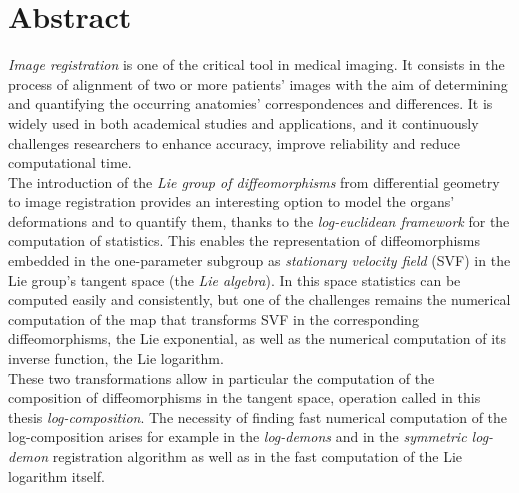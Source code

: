 
\qquad
\pagestyle{empty}
\newpage


\section*{Abstract}

\emph{Image registration} is one of the critical tool in medical imaging. It consists in the process of alignment of two or more patients' images with the aim of determining and quantifying the occurring anatomies' correspondences and differences.
It is widely used in both academical studies and applications, and it continuously challenges researchers to enhance accuracy, improve reliability and reduce computational time.\\

The introduction of the \emph{Lie group of diffeomorphisms} from differential geometry to image registration provides an interesting option to model the organs' deformations and to quantify them, thanks to the \emph{log-euclidean framework} for the computation of statistics.
This enables the representation of diffeomorphisms embedded in the one-parameter subgroup as \emph{stationary velocity field} (SVF) in the Lie group's tangent space (the \emph{Lie algebra}). In this space statistics can be computed easily and consistently, but one of the challenges remains the numerical computation of the map that transforms SVF in the corresponding diffeomorphisms, the Lie exponential, as well as the numerical computation of its inverse function, the Lie logarithm. \\

These two transformations allow in particular the computation of the composition of diffeomorphisms in the tangent space, operation called in this thesis \emph{log-composition}. 
The necessity of finding fast numerical computation of the log-composition arises for example in the \emph{log-demons} and in the \emph{symmetric log-demon} registration algorithm as well as in the fast computation of the Lie logarithm itself.\\

